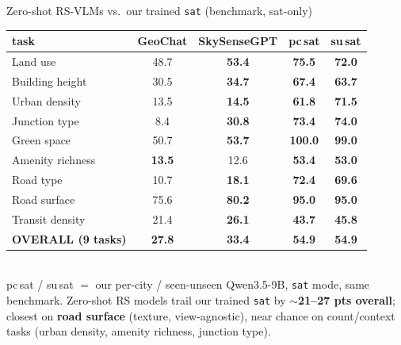 \documentclass[aspectratio=169]{beamer}
\begin{document}
\begin{frame}{Zero-shot RS-VLMs vs.\ our trained \texttt{sat} (benchmark, sat-only)}
\centering\footnotesize
\begin{tabular}{lcc>{\bfseries}c>{\bfseries}c}
\toprule
task & GeoChat & SkySenseGPT & pc\,sat & su\,sat \\
\midrule
Land use & 48.7 & \textbf{53.4} & 75.5 & 72.0 \\
Building height & 30.5 & \textbf{34.7} & 67.4 & 63.7 \\
Urban density & 13.5 & \textbf{14.5} & 61.8 & 71.5 \\
Junction type & 8.4 & \textbf{30.8} & 73.4 & 74.0 \\
Green space & 50.7 & \textbf{53.7} & 100.0 & 99.0 \\
Amenity richness & \textbf{13.5} & 12.6 & 53.4 & 53.0 \\
Road type & 10.7 & \textbf{18.1} & 72.4 & 69.6 \\
Road surface & 75.6 & \textbf{80.2} & 95.0 & 95.0 \\
Transit density & 21.4 & \textbf{26.1} & 43.7 & 45.8 \\
\midrule
\textbf{OVERALL (9 tasks)} & \textbf{27.8} & \textbf{33.4} & \textbf{54.9} & \textbf{54.9} \\
\bottomrule
\end{tabular}\\[6pt]
\footnotesize pc\,sat / su\,sat $=$ our per-city / seen-unseen Qwen3.5-9B, \texttt{sat} mode, same benchmark.
Zero-shot RS models trail our trained \texttt{sat} by \textbf{$\sim$21--27 pts overall}; closest on
\textbf{road surface} (texture, view-agnostic), near chance on count/context tasks (urban density, amenity richness, junction type).
\end{frame}
\end{document}
